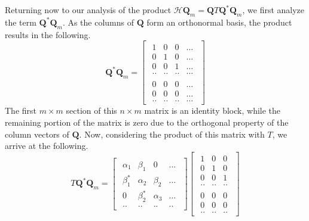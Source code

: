 \documentclass[12pt]{article} %
\begin{document}
Returning now to our analysis of the product $\mathcal{H}\textbf{Q}_m = \textbf{Q} T \textbf{Q}^* \textbf{Q}_m $, we first analyze the term $\textbf{Q}^*\textbf{Q}_m$. As the columns of $\textbf{Q}$ form an orthonormal basis, the product results in the following.
\begin{equation}
    \textbf{Q}^* \textbf{Q}_m = \begin{bmatrix}
\begin{array}{cccc}
1 & 0 & 0 & \ldots \\
0 & 1 & 0 & \ldots \\
0 & 0 & 1 &\ldots \\
.. & .. & .. & \ldots
\end{array} \\
\hline
\begin{array}{cccc}
0 & 0 & 0 & \ldots\\
0 & 0 & 0 & \ldots\\
..&..&..& \ldots
\end{array}
\end{bmatrix}
\end{equation}
The first $m \times m$ section of this $n\times m$ matrix is an identity block, while the remaining portion of the matrix is zero due to the orthogonal property of the column vectors of $\textbf{Q}$. Now, considering the product of this matrix with $T$, we arrive at the following.
\begin{equation}
    T\textbf{Q}^* \textbf{Q}_m = \begin{bmatrix}
        \begin{array}{cccc}
        \alpha_1 &\beta_1& 0 &...\\
        \beta_1^* & \alpha_2 & \beta_2 & \ldots \\
        0 &\beta_2^* & \alpha_3 & \ldots\\ 
        .. & .. & .. & ..
        \end{array}
    \end{bmatrix}
    \begin{bmatrix}
        \begin{array}{ccc}
1 & 0 & 0 \\
0 & 1 & 0 \\
0 & 0 & 1 \\
.. & .. & ..
\end{array} \\
\hline
\begin{array}{ccc}
0 & 0 & 0 \\
0 & 0 & 0 \\
..&..&..
\end{array}
    \end{bmatrix}
\end{equation}
\end{document}
